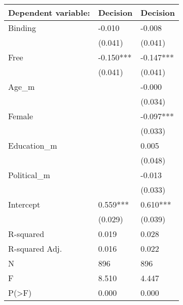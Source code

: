 \begin{tabular}{lll}
\toprule
Dependent variable: &   Decision &   Decision \\
\midrule
Binding        &     -0.010 &     -0.008 \\
               &    (0.041) &    (0.041) \\
Free           &  -0.150*** &  -0.147*** \\
               &    (0.041) &    (0.041) \\
Age\_m          &            &     -0.000 \\
               &            &    (0.034) \\
Female         &            &  -0.097*** \\
               &            &    (0.033) \\
Education\_m    &            &      0.005 \\
               &            &    (0.048) \\
Political\_m    &            &     -0.013 \\
               &            &    (0.033) \\
Intercept      &   0.559*** &   0.610*** \\
               &    (0.029) &    (0.039) \\
R-squared      &      0.019 &      0.028 \\
R-squared Adj. &      0.016 &      0.022 \\
N              &        896 &        896 \\
F              &      8.510 &      4.447 \\
P(>F)          &      0.000 &      0.000 \\
\bottomrule
\end{tabular}
